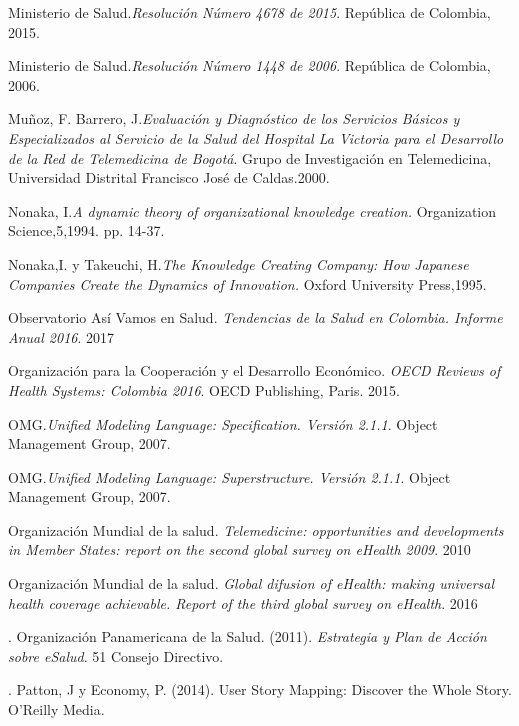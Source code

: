 \begin{thebibliography}{}
 Ministerio de Salud.\textit{Resolución Número 4678 de 2015}. República de Colombia, 2015.

 Ministerio de Salud.\textit{Resolución Número 1448 de 2006}. República de Colombia, 2006.

 Muñoz, F. Barrero, J.\textit{Evaluación y Diagnóstico de los Servicios Básicos y Especializados al Servicio de la Salud del Hospital La Victoria para el Desarrollo de la Red de Telemedicina de Bogotá}. Grupo de Investigación en Telemedicina,  Universidad Distrital Francisco José de Caldas.2000.

 Nonaka, I.\textit{A dynamic theory of organizational knowledge creation.} Organization Science,5,1994. pp. 14-37.

 Nonaka,I. y Takeuchi, H.\textit{The Knowledge Creating Company: How Japanese Companies Create the Dynamics of Innovation.} Oxford University Press,1995.

 Observatorio Así Vamos en Salud. \textit{Tendencias de la Salud en Colombia. Informe Anual 2016}. 2017

 Organización para la Cooperación y el Desarrollo Económico. \textit{OECD Reviews of Health Systems: Colombia 2016}. OECD Publishing, Paris. 2015.

 OMG.\textit{Unified Modeling Language: Specification. Versión 2.1.1}. Object Management Group, 2007.

 OMG.\textit{Unified Modeling Language: Superstructure. Versión 2.1.1}. Object Management Group, 2007.

 Organización Mundial de la salud. \textit{Telemedicine: opportunities and developments in Member States: report on the second global survey on eHealth 2009}. 2010

 Organización Mundial de la salud. \textit{Global difusion of eHealth: making universal health coverage achievable. Report of the third global survey on eHealth}. 2016

. Organización Panamericana de la Salud. (2011). \textit{Estrategia y Plan de Acción sobre eSalud}. 51 Consejo Directivo.

. Patton, J y Economy, P. (2014). User Story Mapping: Discover the Whole Story. O'Reilly Media.


\end{thebibliography}
